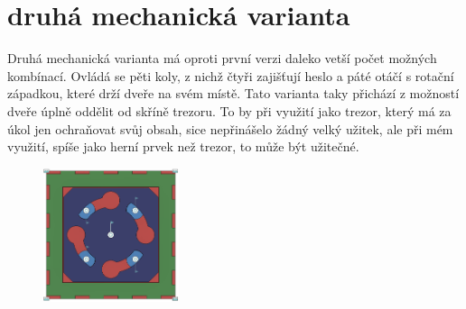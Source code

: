 \section*{druhá mechanická varianta}

Druhá mechanická varianta má oproti první verzi daleko vetší počet možných kombínací.
Ovládá se pěti koly, z nichž čtyři zajišťují heslo a páté otáčí s rotační západkou, které drží dveře na svém místě.
Tato varianta taky přichází z možností dveře úplně oddělit od skříně trezoru. To by při využití jako trezor, který
má za úkol jen ochraňovat svůj obsah, sice nepřinášelo žádný velký užitek, ale při mém využití, spíše jako herní 
prvek než trezor, to může být užitečné.

\begin{figure}[htbp]
    \centering
    \includegraphics[width=150]{kapitoly/obrazky/M2/mechanizmus_odemcen.png}

\end{figure}
